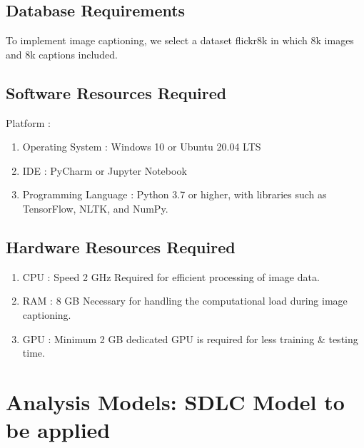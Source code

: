\documentclass[oneside,a4paper,12pt]{report}
\begin{document}
\subsection{Database Requirements}  
To implement image captioning, we select a dataset flickr8k in which 8k images and 8k captions included.

\subsection{Software Resources Required}
Platform : 
\begin{enumerate}
\item Operating System : Windows 10 or Ubuntu 20.04 LTS
\item IDE : PyCharm or Jupyter Notebook
\item Programming Language : Python 3.7 or higher, with libraries such as TensorFlow, NLTK, and NumPy.
\end{enumerate}

\subsection{Hardware Resources Required}
\begin{enumerate}
\item{CPU : Speed 2 GHz Required for efficient processing of image data.}
\item{RAM : 8 GB Necessary for handling the computational load during image captioning.}
\item{GPU : Minimum 2 GB dedicated GPU is required for less training \& testing time.}

\end{enumerate}
 
\section{Analysis Models: SDLC Model to be applied}
\end{document}
